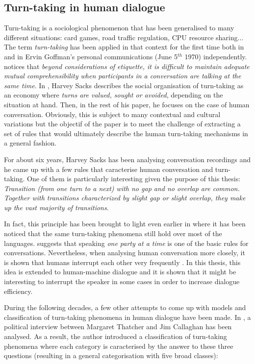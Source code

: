     \subsection{Turn-taking in human dialogue}
    \label{soa:ttphuman}
    
    Turn-taking is a sociological phenomenon that has been generalised to many different situations: card games, road traffic regulation, CPU resource sharing... The term \textit{turn-taking} has been applied in that context for the first time both in \cite{Yngve1970} and in Ervin Goffman's personal communications (June 5$^{th}$ 1970) independently. \cite{Duncan1972} notices that \textit{beyond considerations of etiquette, it is difficult to maintain adequate mutual comprehensibility when participants in a conversation are talking at the same time}. In \cite{Sacks1974}, Harvey Sacks describes the social organisation of turn-taking as an economy where \textit{turns are valued, sought or avoided}, depending on the situation at hand. Then, in the rest of his paper, he focuses on the case of human conversation. Obviously, this is subject to many contextual and cultural variations but the objectif of the paper is to meet the challenge of extracting a set of rules that would ultimately describe the human turn-taking mechanisms in a general fashion.
        
        For about six years, Harvey Sacks has been analysing conversation recordings and he came up with a few rules that caracterise human conversation and turn-taking. One of them is particularly interesting given the purpose of this thesis: \textit{Transition (from one turn to a next) with no gap and no overlap are common. Together with transitions characterized by slight gap or slight overlap, they make up the vast majority of transitions}.
        
        In fact, this principle has been brought to light even earlier in \cite{Sullivan1947} where it has been noticed that the same turn-taking phenomena still hold over most of the languages. \cite{Schegloff1968} suggests that speaking \textit{one party at a time} is one of the basic rules for conversations. Nevertheless, when analysing human conversation more closely, it is shown that humans interrupt each other very frequently \cite{Beattie1982,Strombergsson2013}. In this thesis, this idea is extended to human-machine dialogue and it is shown that it might be interesting to interrupt the speaker in some cases in order to increase dialogue efficiency.
        
        During the following decades, a few other attempts to come up with models and classification of turn-taking phenomena in human dialogue have been made. In \cite{Beattie1982}, a political interview between Margaret Thatcher and Jim Callaghan has been analysed. As a result, the author introduced a classification of turn-taking phenomena where each category is caracterised by the answer to these three questions (resulting in a general categorisation with five broad classes):
        
